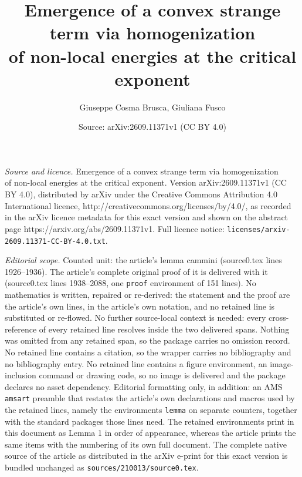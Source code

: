 \documentclass[10pt,a4paper]{amsart}
\title{Emergence of a convex strange term via homogenization \\ of non-local energies at the critical exponent}
\author{Giuseppe Cosma Brusca, Giuliana Fusco}
\date{Source: arXiv:2609.11371v1 (CC BY 4.0)}
\begin{document}
\maketitle

\noindent\emph{Source and licence.} Emergence of a convex strange term via homogenization \\ of non-local energies at the critical exponent. Version arXiv:2609.11371v1 (CC BY 4.0), distributed by arXiv under the Creative Commons Attribution 4.0 International licence, http://creativecommons.org/licenses/by/4.0/, as recorded in the arXiv licence metadata for this exact version and shown on the abstract page https://arxiv.org/abs/2609.11371v1. Full licence notice: \texttt{licenses/arxiv-2609.11371-CC-BY-4.0.txt}.\par\smallskip

\noindent\textit{Editorial scope.} Counted unit: the article's lemma cammini (source0.tex lines 1926--1936). The article's complete original proof of it is delivered with it (source0.tex lines 1938--2088, one \texttt{proof} environment of 151 lines). No mathematics is written, repaired or re-derived: the statement and the proof are the article's own lines, in the article's own notation, and no retained line is substituted or re-flowed.  No further source-local context is needed: every cross-reference of every retained line resolves inside the two delivered spans.  Nothing was omitted from any retained span, so the package carries no omission record.  No retained line contains a citation, so the wrapper carries no bibliography and no bibliography entry.  No retained line contains a figure environment, an image-inclusion command or drawing code, so no image is delivered and the package declares no asset dependency.  Editorial formatting only, in addition: an AMS \texttt{amsart} preamble that restates the article's own declarations and macros used by the retained lines, namely the environments \texttt{lemma} on separate counters, together with the standard packages those lines need.  The retained environments print in this document as Lemma 1 in order of appearance, whereas the article prints the same items with the numbering of its own full document.  The complete native source of the article as distributed in the arXiv e-print for this exact version is bundled unchanged as \texttt{sources/210013/source0.tex}.
\end{document}
